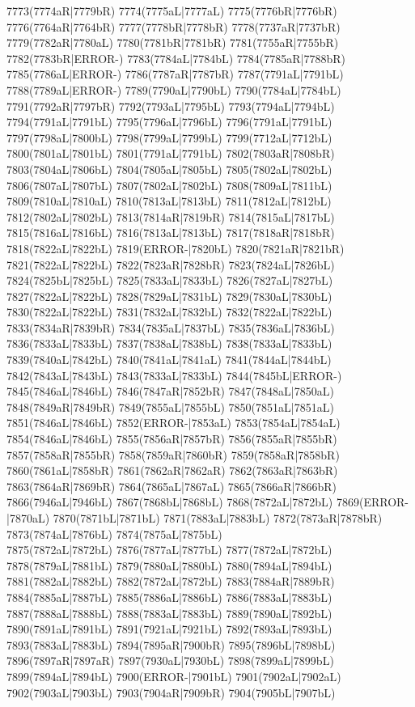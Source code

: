 7773(7774aR|7779bR) 7774(7775aL|7777aL) 7775(7776bR|7776bR) \\7776(7764aR|7764bR) 7777(7778bR|7778bR) 7778(7737aR|7737bR) 7779(7782aR|7780aL) 7780(7781bR|7781bR) 7781(7755aR|7755bR) 7782(7783bR|ERROR-) 7783(7784aL|7784bL) 7784(7785aR|7788bR) \\7785(7786aL|ERROR-) 7786(7787aR|7787bR) 7787(7791aL|7791bL) 7788(7789aL|ERROR-) 7789(7790aL|7790bL) 7790(7784aL|7784bL) 7791(7792aR|7797bR) 7792(7793aL|7795bL) 7793(7794aL|7794bL) \\7794(7791aL|7791bL) 7795(7796aL|7796bL) 7796(7791aL|7791bL) 7797(7798aL|7800bL) 7798(7799aL|7799bL) 7799(7712aL|7712bL) 7800(7801aL|7801bL) 7801(7791aL|7791bL) 7802(7803aR|7808bR) \\7803(7804aL|7806bL) 7804(7805aL|7805bL) 7805(7802aL|7802bL) 7806(7807aL|7807bL) 7807(7802aL|7802bL) 7808(7809aL|7811bL) 7809(7810aL|7810aL) 7810(7813aL|7813bL) 7811(7812aL|7812bL) \\7812(7802aL|7802bL) 7813(7814aR|7819bR) 7814(7815aL|7817bL) 7815(7816aL|7816bL) 7816(7813aL|7813bL) 7817(7818aR|7818bR) 7818(7822aL|7822bL) 7819(ERROR-|7820bL) 7820(7821aR|7821bR) \\7821(7822aL|7822bL) 7822(7823aR|7828bR) 7823(7824aL|7826bL) 7824(7825bL|7825bL) 7825(7833aL|7833bL) 7826(7827aL|7827bL) 7827(7822aL|7822bL) 7828(7829aL|7831bL) 7829(7830aL|7830bL) \\7830(7822aL|7822bL) 7831(7832aL|7832bL) 7832(7822aL|7822bL) 7833(7834aR|7839bR) 7834(7835aL|7837bL) 7835(7836aL|7836bL) 7836(7833aL|7833bL) 7837(7838aL|7838bL) 7838(7833aL|7833bL) \\7839(7840aL|7842bL) 7840(7841aL|7841aL) 7841(7844aL|7844bL) 7842(7843aL|7843bL) 7843(7833aL|7833bL) 7844(7845bL|ERROR-) 7845(7846aL|7846bL) 7846(7847aR|7852bR) 7847(7848aL|7850aL) \\7848(7849aR|7849bR) 7849(7855aL|7855bL) 7850(7851aL|7851aL) 7851(7846aL|7846bL) 7852(ERROR-|7853aL) 7853(7854aL|7854aL) 7854(7846aL|7846bL) 7855(7856aR|7857bR) 7856(7855aR|7855bR) \\7857(7858aR|7855bR) 7858(7859aR|7860bR) 7859(7858aR|7858bR) 7860(7861aL|7858bR) 7861(7862aR|7862aR) 7862(7863aR|7863bR) 7863(7864aR|7869bR) 7864(7865aL|7867aL) 7865(7866aR|7866bR) \\7866(7946aL|7946bL) 7867(7868bL|7868bL) 7868(7872aL|7872bL) 7869(ERROR-|7870aL) 7870(7871bL|7871bL) 7871(7883aL|7883bL) 7872(7873aR|7878bR) 7873(7874aL|7876bL) 7874(7875aL|7875bL) \\7875(7872aL|7872bL) 7876(7877aL|7877bL) 7877(7872aL|7872bL) 7878(7879aL|7881bL) 7879(7880aL|7880bL) 7880(7894aL|7894bL) 7881(7882aL|7882bL) 7882(7872aL|7872bL) 7883(7884aR|7889bR) \\7884(7885aL|7887bL) 7885(7886aL|7886bL) 7886(7883aL|7883bL) 7887(7888aL|7888bL) 7888(7883aL|7883bL) 7889(7890aL|7892bL) 7890(7891aL|7891bL) 7891(7921aL|7921bL) 7892(7893aL|7893bL) \\7893(7883aL|7883bL) 7894(7895aR|7900bR) 7895(7896bL|7898bL) 7896(7897aR|7897aR) 7897(7930aL|7930bL) 7898(7899aL|7899bL) 7899(7894aL|7894bL) 7900(ERROR-|7901bL) 7901(7902aL|7902aL) \\7902(7903aL|7903bL) 7903(7904aR|7909bR) 7904(7905bL|7907bL) 